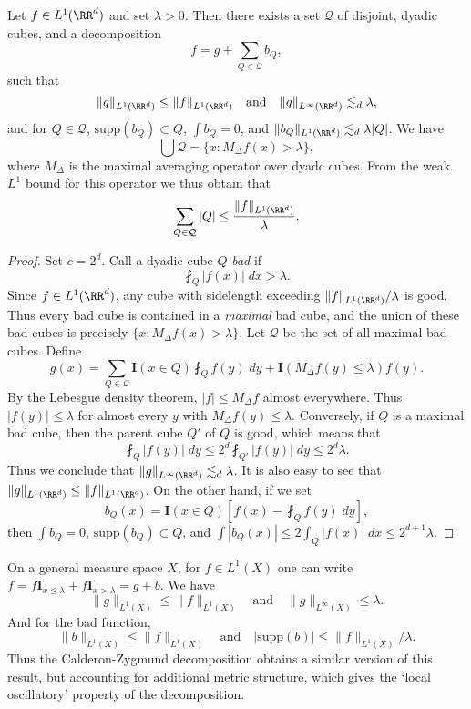 \begin{theorem}
    Let $f \in L^1(\RR^d)$ and set $\lambda > 0$. Then there exists a set $\mathcal{Q}$ of disjoint, dyadic cubes, and a decomposition
    \[ f = g + \sum_{Q \in \mathcal{Q}} b_Q, \]
    such that
    \[ \| g \|_{L^1(\RR^d)} \leq \| f \|_{L^1(\RR^d)}  \quad\text{and}\quad   \| g \|_{L^\infty(\RR^d)} \lesssim_d \lambda, \]
    and for $Q \in \mathcal{Q}$, $\text{supp}(b_Q) \subset Q$, $\int b_Q = 0$, and $\| b_Q \|_{L^1(\RR^d)} \lesssim_d \lambda |Q|$. We have
    \[ \bigcup \mathcal{Q} = \{ x : M_\Delta f(x) > \lambda \}, \]
    where $M_\Delta$ is the maximal averaging operator over dyadc cubes. From the weak $L^1$ bound for this operator we thus obtain that
    \[ \sum_{Q \in \mathcal{Q}} |Q| \leq \frac{\| f \|_{L^1(\RR^d)}}{\lambda}. \]
\end{theorem}
\begin{proof}
    Set $c = 2^d$. Call a dyadic cube $Q$ \emph{bad} if
    \[ \fint_Q |f(x)|\; dx > \lambda. \]
    Since $f \in L^1(\RR^d)$, any cube with sidelength exceeding $\| f \|_{L^1(\RR^d)} / \lambda$ is good. Thus every bad cube is contained in a \emph{maximal} bad cube, and the union of these bad cubes is precisely $\{ x : M_\Delta f(x) > \lambda \}$. Let $\mathcal{Q}$ be the set of all maximal bad cubes. Define
    \[ g(x) = \sum_{Q \in \mathcal{Q}} \mathbf{I}(x \in Q) \fint_Q f(y)\; dy + \mathbf{I}(M_\Delta f(y) \leq \lambda) f(y). \]
    By the Lebesgue density theorem, $|f| \leq M_\Delta f$ almost everywhere. Thus $|f(y)| \leq \lambda$ for almost every $y$ with $M_\Delta f(y) \leq \lambda$. Conversely, if $Q$ is a maximal bad cube, then the parent cube $Q'$ of $Q$ is good, which means that
    \[ \fint_Q |f(y)|\; dy \leq 2^d \fint_{Q'} |f(y)|\; dy \leq 2^d \lambda. \]
    Thus we conclude that $\| g \|_{L^\infty(\RR^d)} \lesssim_d \lambda$. It is also easy to see that $\| g \|_{L^1(\RR^d)} \leq \| f \|_{L^1(\RR^d)}$. On the other hand, if we set
    \[ b_Q(x) = \mathbf{I}(x \in Q) [f(x) - \fint_Q f(y)\; dy], \]
    then $\int b_Q = 0$, $\text{supp}(b_Q) \subset Q$, and $\int |b_Q(x)| \leq 2 \int_Q |f(x)|\; dx \leq 2^{d+1} \lambda$.
\end{proof}

\begin{remark}
    On a general measure space $X$, for $f \in L^1(X)$ one can write $f = f \mathbf{I}_{x \leq \lambda} + f \mathbf{I}_{x > \lambda} = g + b$. We have
    \[ \| g \|_{L^1(X)} \leq \| f \|_{L^1(X)} \quad\text{and}\quad \| g \|_{L^\infty(X)} \leq \lambda. \]
    And for the bad function,
    \[ \| b \|_{L^1(X)} \leq \| f \|_{L^1(X)} \quad\text{and}\quad |\text{supp}(b)| \leq \| f \|_{L^1(X)} / \lambda. \]
    Thus the Calderon-Zygmund decomposition obtains a similar version of this result, but accounting for additional metric structure, which gives the `local oscillatory' property of the decomposition.
\end{remark}


